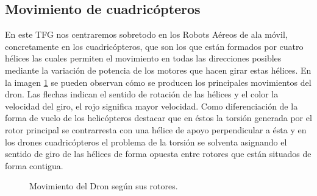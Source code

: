 \subsection{Movimiento de cuadricópteros}
\hspace{1cm} En este TFG nos centraremos sobretodo en los Robots Aéreos de ala móvil, concretamente en los cuadricópteros, que son los que están formados por cuatro hélices las cuales permiten el movimiento en todas las direcciones posibles mediante la variación de potencia de los motores que hacen girar estas hélices. En la imagen \ref{f:Moviento en drones.} se pueden observan cómo se producen los principales movimientos del dron. Las flechas indican el sentido de rotación de las hélices y el color la velocidad del giro, el rojo significa mayor velocidad. Como diferenciación de la forma de vuelo de los helicópteros destacar que en éstos la torsión generada por el rotor principal se contrarresta con una hélice de apoyo perpendicular a ésta y en los drones cuadricópteros el problema de la torsión se solventa asignando el sentido de giro de las hélices de forma opuesta entre rotores que están situados de forma contigua.

\begin{figure}[H]
 \centering
 \caption{Movimiento del Dron según sus rotores.}
 \label{f:Moviento en drones.}
\end{figure}

